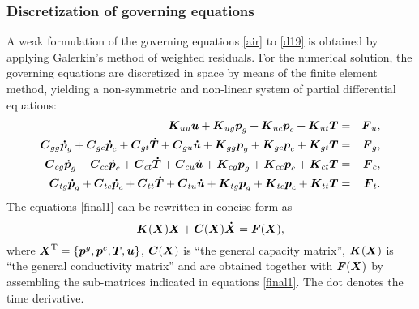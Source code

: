 \subsubsection{Discretization of governing equations}

A weak formulation of the governing equations \eqref{air} to \eqref{d19} is obtained by applying Galerkin's method
of weighted residuals. For the numerical solution, the governing equations are discretized in space by means of the 
finite element method, yielding a non-symmetric and non-linear system of partial differential equations:
\begin{eqnarray}\label{final1}
\mbox{\boldmath$K$}_{uu}\mbox{\boldmath$u$} + \mbox{\boldmath$K$}_{ug}\mbox{\boldmath$p$}_g + \mbox{\boldmath$K$}_{uc}\mbox{\boldmath$p$}_c + \mbox{\boldmath$K$}_{ut}\mbox{\boldmath$T$} &=& \mbox{\boldmath$F$}_u,\nonumber\\
\mbox{\boldmath$C$}_{gg}\mbox{\boldmath$\dot{p}$}_g + \mbox{\boldmath$C$}_{gc}\mbox{\boldmath$\dot{p}$}_c + \mbox{\boldmath$C$}_{gt}\mbox{\boldmath$\dot{T}$} +\mbox{\boldmath$C$}_{gu}\mbox{\boldmath$\dot{u}$} + 
\mbox{\boldmath$K$}_{gg}\mbox{\boldmath$p$}_g + \mbox{\boldmath$K$}_{gc}\mbox{\boldmath$p$}_c + \mbox{\boldmath$K$}_{gt}\mbox{\boldmath$T$} &=& \mbox{\boldmath$F$}_g,\nonumber\\
\mbox{\boldmath$C$}_{cg}\mbox{\boldmath$\dot{p}$}_g + \mbox{\boldmath$C$}_{cc}\mbox{\boldmath$\dot{p}$}_c + \mbox{\boldmath$C$}_{ct}\mbox{\boldmath$\dot{T}$} + \mbox{\boldmath$C$}_{cu}\mbox{\boldmath$\dot{u}$} + 
\mbox{\boldmath$K$}_{cg}\mbox{\boldmath$p$}_g + \mbox{\boldmath$K$}_{cc}\mbox{\boldmath$p$}_c + \mbox{\boldmath$K$}_{ct}\mbox{\boldmath$T$} &=& \mbox{\boldmath$F$}_c,\\
\mbox{\boldmath$C$}_{tg}\mbox{\boldmath$\dot{p}$}_g + \mbox{\boldmath$C$}_{tc}\mbox{\boldmath$\dot{p}$}_c + \mbox{\boldmath$C$}_{tt}\mbox{\boldmath$\dot{T}$} + \mbox{\boldmath$C$}_{tu}\mbox{\boldmath$\dot{u}$} + 
\mbox{\boldmath$K$}_{tg}\mbox{\boldmath$p$}_g + \mbox{\boldmath$K$}_{tc}\mbox{\boldmath$p$}_c + \mbox{\boldmath$K$}_{tt}\mbox{\boldmath$T$} &=& \mbox{\boldmath$F$}_t.\nonumber
\end{eqnarray}
The equations \eqref{final1} can be rewritten in concise form as
\begin{equation}\label{final2}
\mbox{\boldmath$K$}(\mbox{\boldmath$X$})\mbox{\boldmath$X$} + \mbox{\boldmath$C$}(\mbox{\boldmath$X$})\mbox{\boldmath$\dot{X}$} = \mbox{\boldmath$F$}(\mbox{\boldmath$X$}),
\end{equation}
where $\mbox{\boldmath$X$}^{\rm T} = \{\mbox{\boldmath$p$}^g,\mbox{\boldmath$p$}^c,\mbox{\boldmath$T$},\mbox{\boldmath$u$}\}$, $\mbox{\boldmath$C$}(\mbox{\boldmath$X$})$ is ``the general capacity matrix'', 
$\mbox{\boldmath$K$}(\mbox{\boldmath$X$})$ is ``the general conductivity matrix'' and are obtained together with $\mbox{\boldmath$F$}(\mbox{\boldmath$X$})$ 
by assembling the sub-matrices indicated in equations \eqref{final1}. The dot denotes the time derivative.


